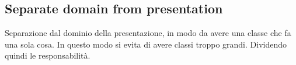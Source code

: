 \subsection{Separate domain from presentation}
Separazione dal dominio della presentazione, in modo da avere una classe che
fa una sola cosa. In questo modo si evita di avere classi troppo grandi.
Dividendo quindi le responsabilità.
